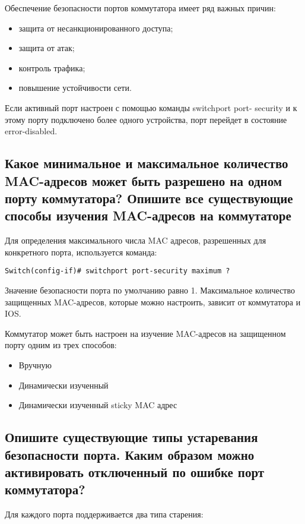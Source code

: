 Обеспечение безопасности портов коммутатора имеет ряд важных 
причин:

\begin{itemize}
	\item защита от несанкционированного доступа;
	\item защита от атак;
	\item контроль трафика;
	\item повышение устойчивости сети.
\end{itemize}

Если активный порт настроен с помощью команды switchport port-
security и к этому порту подключено более одного устройства, порт перейдет 
в состояние error-disabled.

\subsection{Какое минимальное и максимальное количество MAC-адресов 
может быть разрешено на одном порту коммутатора? Опишите 
все существующие способы изучения MAC-адресов на 
коммутаторе}

Для определения максимального числа MAC адресов, разрешенных для 
конкретного порта, используется команда:

\begin{verbatim}
Switch(config-if)# switchport port-security maximum ?
\end{verbatim}

Значение безопасности порта по умолчанию равно 1. Максимальное 
количество защищенных MAC-адресов, которые можно настроить, зависит 
от коммутатора и IOS.

Коммутатор может быть настроен на изучение MAC-адресов на 
защищенном порту одним из трех способов:

\begin{itemize}
	\item Вручную
	\item Динамически изученный
	\item Динамически изученный sticky MAC адрес
\end{itemize}

\subsection{Опишите существующие типы устаревания безопасности порта. 
Каким образом можно активировать отключенный по ошибке 
порт коммутатора?}

Для каждого порта поддерживается два типа старения:

